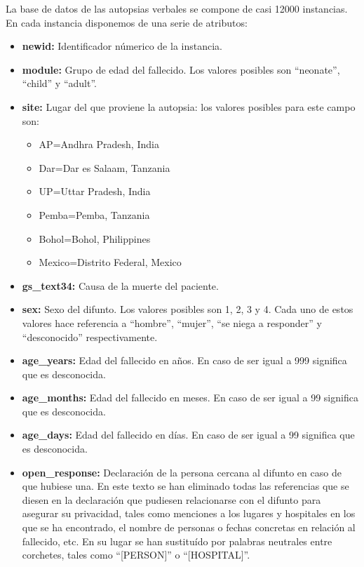 \documentclass[10pt,a4paper,draft]{article}
\begin{document}
La base de datos de las autopsias verbales se compone de casi 12000 instancias. En cada instancia disponemos de una serie de atributos:

\begin{itemize}
\item \textbf{newid:} Identificador númerico de la instancia.
\item \textbf{module:} Grupo de edad del fallecido. Los valores posibles son ``neonate'', ``child'' y ``adult''.



\item \textbf{site:} Lugar del que proviene la autopsia: los valores posibles para este campo son:
    \begin{itemize}
    \item AP=Andhra Pradesh, India
    \item Dar=Dar es Salaam, Tanzania
    \item UP=Uttar Pradesh, India
    \item Pemba=Pemba, Tanzania
    \item Bohol=Bohol, Philippines
    \item Mexico=Distrito Federal, Mexico
    \end{itemize}
\item \textbf{gs\_text34:} Causa de la muerte del paciente.
\item \textbf{sex:} Sexo del difunto. Los valores posibles son 1, 2, 3 y 4. Cada uno de estos valores hace referencia a ``hombre'', ``mujer'', ``se niega a responder'' y ``desconocido'' respectivamente.
\item \textbf{age\_years:} Edad del fallecido en años. En caso de ser igual a 999 significa que es desconocida.
\item \textbf{age\_months:} Edad del fallecido en meses. En caso de ser igual a 99 significa que es desconocida.
\item \textbf{age\_days:} Edad del fallecido en días. En caso de ser igual a 99 significa que es desconocida.
\item \textbf{open\_response:} Declaración de la persona cercana al difunto en caso de que hubiese una. En este texto se han eliminado todas las referencias que se diesen en la declaración que pudiesen relacionarse con el difunto para asegurar su privacidad, tales como menciones a los lugares y hospitales en los que se ha encontrado, el nombre de personas o fechas concretas en relación al fallecido, etc. En su lugar se han sustituído por palabras neutrales entre corchetes, tales como ``[PERSON]'' o ``[HOSPITAL]''.
\end{itemize}
\end{document}
